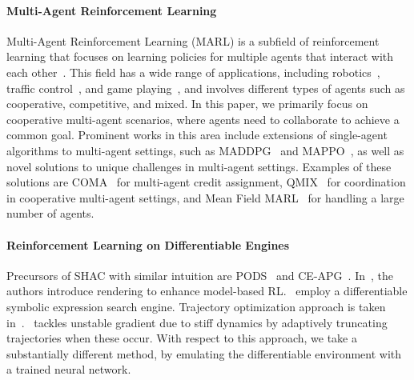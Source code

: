 \paragraph{Multi-Agent Reinforcement Learning}
Multi-Agent Reinforcement Learning (MARL) is a subfield of reinforcement learning that focuses on learning policies for multiple agents that interact with each other~\cite{albrecht2024multi}.
This field has a wide range of applications,
including robotics~\cite{DBLP:journals/air/ChungFYN24},
traffic control~\cite{DBLP:journals/tits/ChuWCL20},
and game playing~\cite{DBLP:conf/iclr/BakerKMWPMM20,jaderberg2019human},
and involves different types of agents such as cooperative, competitive, and mixed.
In this paper, we primarily focus on cooperative multi-agent scenarios,
where agents need to collaborate to achieve a common goal.
Prominent works in this area include extensions of single-agent algorithms to multi-agent settings,
such as MADDPG~\cite{DBLP:conf/nips/LoweWTHAM17} and MAPPO~\cite{DBLP:conf/nips/YuVVGWBW22},
as well as novel solutions to unique challenges in multi-agent settings. Examples of these solutions are COMA~\cite{DBLP:conf/aaai/FoersterFANW18} for multi-agent credit assignment,
QMIX~\cite{DBLP:conf/icml/RashidSWFFW18} for coordination in cooperative multi-agent settings,
and Mean Field MARL~\cite{DBLP:conf/icml/YangLLZZW18} for handling a large number of agents.

\paragraph{Reinforcement Learning on Differentiable Engines}
Precursors of SHAC with similar intuition are PODS~\cite{Mora21} and CE-APG~\cite{Gillen22}. In~\cite{Lv23}, the authors introduce rendering to enhance model-based RL\@.\ \citet{Zheng24} employ a differentiable symbolic expression search engine. Trajectory optimization approach is taken in~\cite{Wan24}.\ \citet{Georgiev24} tackles unstable gradient due to stiff dynamics by adaptively truncating trajectories when these occur. With respect to this approach, we take a substantially different method, by emulating the differentiable environment with a trained neural network.
